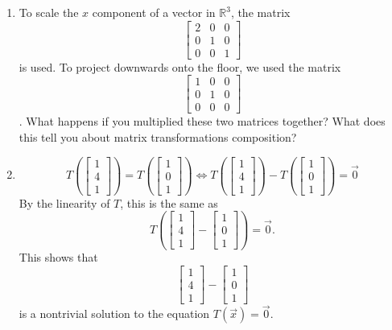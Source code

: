 \begin{enumerate}
	\item To scale the \(x\) component of a vector in \(\mathbb{R}^3\), the matrix \[\begin{bmatrix}2 & 0 & 0 \\ 0 & 1 & 0 \\ 0 & 0 & 1\end{bmatrix}\] is
		used. To project downwards onto the floor, we used the matrix \[\begin{bmatrix}1 & 0 & 0 \\ 0 & 1 & 0 \\ 0 & 0 & 0\end{bmatrix}\]. What happens
		if you multiplied these two matrices together? What does this tell you about matrix transformations composition?

	\item \[T\left(\begin{bmatrix}1 \\ 4 \\ 1\end{bmatrix}\right) = T\left(\begin{bmatrix}1 \\ 0 \\ 1\end{bmatrix}\right) 
		  \iff T\left(\begin{bmatrix}1 \\ 4 \\ 1\end{bmatrix}\right) - T\left(\begin{bmatrix}1 \\ 0 \\ 1\end{bmatrix}\right) = \vec{0}\]
		By the linearity of \(T\), this is the same as
		\[T\left(\begin{bmatrix}1 \\ 4 \\ 1\end{bmatrix} - \begin{bmatrix}1 \\ 0 \\ 1\end{bmatrix}\right) = \vec{0}.\] This shows that 
		\[\begin{bmatrix}1 \\ 4 \\ 1\end{bmatrix} - \begin{bmatrix}1 \\ 0 \\ 1\end{bmatrix}\] is a nontrivial solution to the equation \(T(\vec{x}) = \vec{0}.\)


\end{enumerate}
